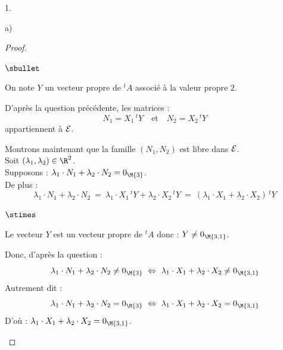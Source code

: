 \documentclass[11pt]{article}%
\begin{document}
\begin{noliste}{1.}
\begin{noliste}{a)}
\begin{proof}
\begin{noliste}{$\sbullet$}

	  \item On note $Y$ un vecteur propre de ${}^t A$ associé à 
	  la valeur propre $2$.
	  
	  \item D'après la question précédente, les matrices :
	  \[
	    N_1 = X_1 \, {}^t Y \quad \text{et} \quad N_2 = X_2 \, 
	    {}^t Y
	  \]
	  appartiennent à ${\cal E}$. 
	  
	  \item Montrons maintenant que la famille $(N_1,N_2)$ est 
	  libre dans ${\cal E}$.\\
	  Soit $(\lambda_1,\lambda_2) \in \R^2$.\\
	  Supposons : $\lambda_1 \cdot N_1 + \lambda_2 \cdot N_2 =
	  0_{\M{3}}$.\\
	  De plus :
	  \[
          \lambda_1 \cdot N_1 + \lambda_2 \cdot N_2 \ = \ \lambda_1
          \cdot X_1 \, {}^tY + \lambda_2 \cdot X_2 \, {}^t Y \ = \
          (\lambda_1 \cdot X_1 + \lambda_2 \cdot X_2) \, {}^t Y
	  \]
	  \begin{noliste}{$\stimes$}
	    \item Le vecteur $Y$ est un vecteur propre de ${}^t A$ 
	    donc : $Y \neq 0_{\M{3,1}}$.
	    
	    \item Donc, d'après la question  :
	    \[
	      \lambda_1 \cdot N_1 + \lambda_2 \cdot N_2 \neq 
	      0_{\M{3}} \ \Leftrightarrow \ 
	      \lambda_1 \cdot X_1 + \lambda_2 \cdot X_2 \neq 
	      0_{\M{3,1}}
	    \]
	    Autrement dit :
	    \[
	      \lambda_1 \cdot N_1 + \lambda_2 \cdot N_2 = 
	      0_{\M{3}} \ \Leftrightarrow \ 
	      \lambda_1 \cdot X_1 + \lambda_2 \cdot X_2 = 
	      0_{\M{3,1}}
	    \]
	    D'où : $\lambda_1 \cdot X_1 + \lambda_2 \cdot X_2 = 
	      0_{\M{3,1}}$.
	      

\end{noliste}
\end{noliste}
\end{proof}
\end{noliste}
\end{noliste}
\end{document}
